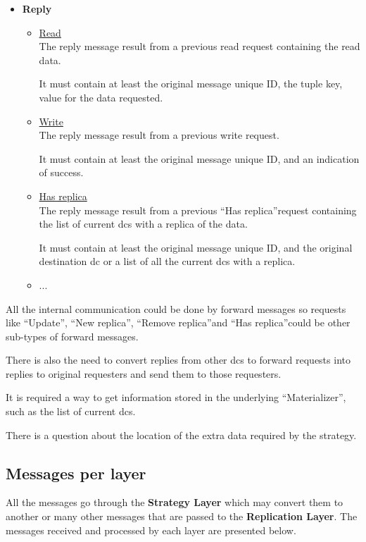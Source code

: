\documentclass[english]{article}
\begin{document}
\begin{itemize}
	\item {\bf Reply}
		\begin{itemize}
			\item \underline{Read}\\
			The reply message result from a previous read request containing the read data.

			It must contain at least the original message unique ID, the tuple key, value for the data requested.

			\item \underline{Write}\\
			The reply message result from a previous write request.

			It must contain at least the original message unique ID, and an indication of success.

			\item \underline{Has replica}\\
			The reply message result from a previous \textquotedblleft Has replica\textquotedblright request containing the list of current \glspl{dc} with a replica of the data.

			It must contain at least the original message unique ID, and the original destination \gls{dc} or a list of all the current \glspl{dc} with a replica.

			\item ...
		\end{itemize}
\end{itemize}

All the internal communication could be done by forward messages so requests like \textquotedblleft Update\textquotedblright, \textquotedblleft New replica\textquotedblright, \textquotedblleft Remove replica\textquotedblright and \textquotedblleft Has replica\textquotedblright could be other sub-types of forward messages.

There is also the need to convert replies from other \glspl{dc} to forward requests into replies to original requesters and send them to those requesters.

It is required a way to get information stored in the underlying \textquotedblleft Materializer\textquotedblright, such as the list of current \glspl{dc}.

There is a question about the location of the extra data required by the strategy.\\

\subsection{Messages per layer}
All the messages go through the {\bf Strategy Layer} which may convert them to another or many other messages that are passed to the {\bf Replication Layer}. The messages received and processed by each layer are presented below.
\end{document}

